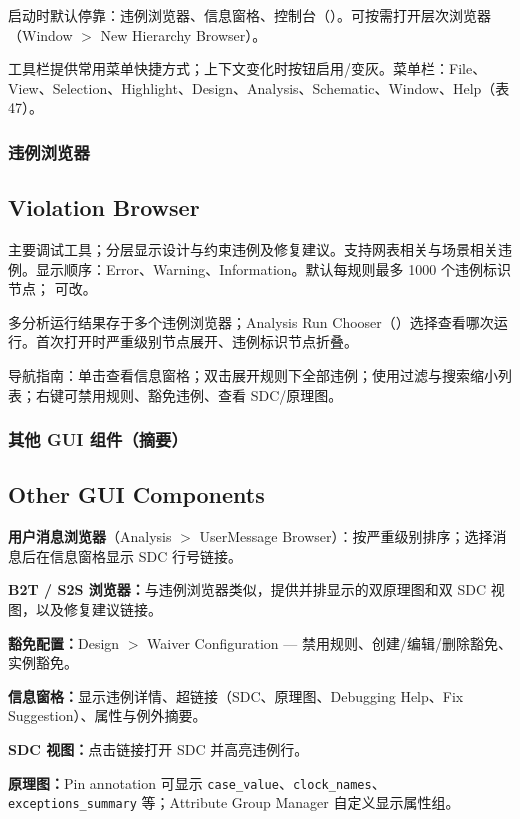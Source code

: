 启动时默认停靠：违例浏览器、信息窗格、控制台（）。可按需打开层次浏览器（Window $>$ New Hierarchy Browser）。

工具栏提供常用菜单快捷方式；上下文变化时按钮启用/变灰。菜单栏：File、View、Selection、Highlight、Design、Analysis、Schematic、Window、Help（表 47）。

\subsubsection{违例浏览器}
\subsection*{Violation Browser}

主要调试工具；分层显示设计与约束违例及修复建议。支持网表相关与场景相关违例。显示顺序：Error、Warning、Information。默认每规则最多 1000 个违例标识节点； 可改。

多分析运行结果存于多个违例浏览器；Analysis Run Chooser（）选择查看哪次运行。首次打开时严重级别节点展开、违例标识节点折叠。

导航指南：单击查看信息窗格；双击展开规则下全部违例；使用过滤与搜索缩小列表；右键可禁用规则、豁免违例、查看 SDC/原理图。

\subsubsection{其他 GUI 组件（摘要）}
\subsection*{Other GUI Components}

\textbf{用户消息浏览器}（Analysis $>$ UserMessage Browser）：按严重级别排序；选择消息后在信息窗格显示 SDC 行号链接。

\textbf{B2T / S2S 浏览器：}与违例浏览器类似，提供并排显示的双原理图和双 SDC 视图，以及修复建议链接。

\textbf{豁免配置：}Design $>$ Waiver Configuration — 禁用规则、创建/编辑/删除豁免、实例豁免。

\textbf{信息窗格：}显示违例详情、超链接（SDC、原理图、Debugging Help、Fix Suggestion）、属性与例外摘要。

\textbf{SDC 视图：}点击链接打开 SDC 并高亮违例行。

\textbf{原理图：}Pin annotation 可显示 \texttt{case\_value}、\texttt{clock\_names}、\texttt{exceptions\_summary} 等；Attribute Group Manager 自定义显示属性组。

